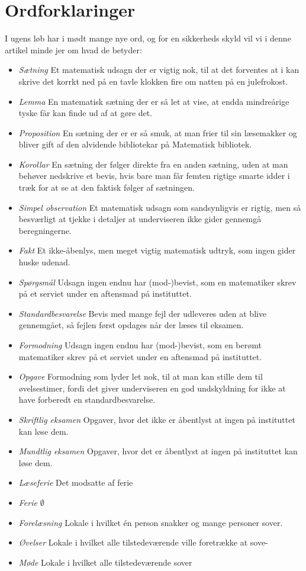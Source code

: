 \begin{minipage}[t]{100mm}
\vspace{3mm}
\section*{Ordforklaringer}
I ugens løb har i mødt mange nye ord, og for en sikkerheds skyld vil vi i denne artikel minde jer om hvad de betyder:
\begin{itemize}
\item \emph{Sætning} Et matematisk udsagn der er vigtig nok, til at det forventes at i kan skrive det korrkt ned på en tavle klokken fire om natten på en julefrokost.
\item \emph{Lemma} En matematisk sætning der er så let at vise, at endda mindreårige tyske får kan finde ud af at gøre det.
\item \emph{Proposition} En sætning der er er så smuk, at man frier til sin læsemakker og bliver gift af den alvidende bibliotekar på Matematisk bibliotek.
\item \emph{Korollar} En sætning der følger direkte fra en anden sætning, uden at man behøver nedskrive et bevis, hvis bare man får femten rigtige smarte idder i træk for at se at den faktisk følger af sætningen.
\item \emph{Simpel observation} Et matematisk udsagn som sandsynligvis er rigtig, men så besværligt at tjekke i detaljer at underviseren ikke gider gennemgå beregningerne.
\item \emph{Fakt} Et ikke-åbenlys, men meget vigtig matematisk udtryk, som ingen gider huske udenad.
\item \emph{Spørgsmål} Udsagn ingen endnu har (mod-)bevist, som en matematiker skrev på et serviet under en aftensmad på instituttet.
\item \emph{Standardbesvarelse} Bevis med mange fejl der udleveres uden at blive gennemgået, så fejlen først opdages når der læses til eksamen.
\item \emph{Formodning} Udsagn ingen endnu har (mod-)bevist, som en berømt matematiker skrev på et serviet under en aftensmad på instituttet.
\item \emph{Opgave} Formodning som lyder let nok, til at man kan stille dem til øvelsestimer, fordi det giver underviseren en god undskyldning for ikke at have forberedt en standardbesvarelse.
\item \emph{Skriftlig eksamen} Opgaver, hvor det ikke er åbentlyst at ingen på instituttet kan løse dem.
\item \emph{Mundtlig eksamen}  Opgaver, hvor det er åbentlyst at ingen på instituttet kan løse dem.
\item \emph{Læseferie} Det modsatte af ferie
\item \emph{Ferie} $\emptyset$
\item \emph{Forelæsning} Lokale i hvilket én person snakker og mange personer sover.
\item \emph{Øvelser} Lokale i hvilket alle tilstedeværende ville foretrække at sove-
\item \emph{Møde} Lokale i hvilket alle tilstedeværende sover
\end{itemize}


\end{minipage}

